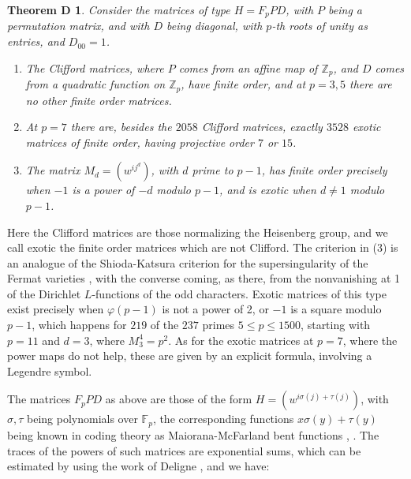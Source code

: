 \documentclass[11pt]{amsart}
\newtheorem*{theoremD}{Theorem D}
\theoremstyle{definition}
\begin{document}
\begin{theoremD}
Consider the matrices of type $H=F_pPD$, with $P$ being a permutation matrix, and with $D$ being diagonal, with $p$-th roots of unity as entries, and $D_{00}=1$.
\begin{enumerate}
\item The Clifford matrices, where $P$ comes from an affine map of $\mathbb Z_p$, and $D$ comes from a quadratic function on $\mathbb Z_p$, have finite order, and at $p=3,5$ there are no other finite order matrices.

\item At $p=7$ there are, besides the $2058$ Clifford matrices, exactly $3528$ exotic matrices of finite order, having projective order $7$ or $15$.

\item The matrix $M_d=(w^{ij^d})$, with $d$ prime to $p-1$, has finite order precisely when $-1$ is a power of $-d$ modulo $p-1$, and is exotic when $d\neq1$ modulo $p-1$.
\end{enumerate}
\end{theoremD}

Here the Clifford matrices are those normalizing the Heisenberg group, and we call exotic the finite order matrices which are not Clifford. The criterion in (3) is an analogue of the Shioda-Katsura criterion for the supersingularity of the Fermat varieties \cite{ska}, with the converse coming, as there, from the nonvanishing at 1 of the Dirichlet $L$-functions of the odd characters. Exotic matrices of this type exist precisely when $\varphi(p-1)$ is not a power of 2, or $-1$ is a square modulo $p-1$, which happens for $219$ of the $237$ primes $5\leq p\leq1500$, starting with $p=11$ and $d=3$, where $M_3^4=p^2$. As for the exotic matrices at $p=7$, where the power maps do not help, these are given by an explicit formula, involving a Legendre symbol.

\medskip

The matrices $F_pPD$ as above are those of the form $H=(w^{i\sigma(j)+\tau(j)})$, with $\sigma,\tau$ being polynomials over $\mathbb F_p$, the corresponding functions $x\sigma(y)+\tau(y)$ being known in coding theory as Maiorana-McFarland bent functions \cite{ksw}, \cite{mcf}. The traces of the powers of such matrices are exponential sums, which can be estimated by using the work of Deligne \cite{dw1}, and we have:
\end{document}
